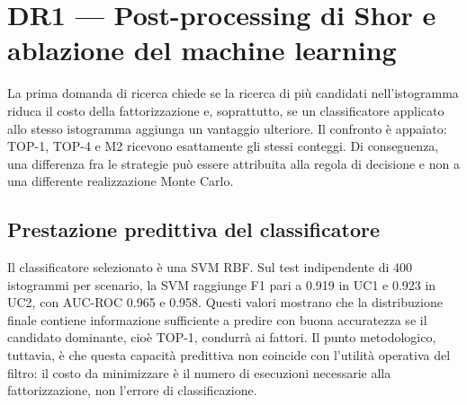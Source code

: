 \section{DR1 --- Post-processing di Shor e ablazione del machine learning}\label{sec:finale_5_1}\label{sec:setup_m1}

La prima domanda di ricerca chiede se la ricerca di più candidati nell'istogramma riduca il costo della fattorizzazione e, soprattutto, se un classificatore applicato allo stesso istogramma aggiunga un vantaggio ulteriore. Il confronto è appaiato: TOP-1, TOP-4 e M2 ricevono esattamente gli stessi conteggi. Di conseguenza, una differenza fra le strategie può essere attribuita alla regola di decisione e non a una differente realizzazione Monte Carlo.

\subsection{Prestazione predittiva del classificatore}\label{sec:finale_5_1_1}

Il classificatore selezionato è una SVM RBF. Sul test indipendente di 400 istogrammi per scenario, la SVM raggiunge F1 pari a 0.919 in UC1 e 0.923 in UC2, con AUC-ROC 0.965 e 0.958. Questi valori mostrano che la distribuzione finale contiene informazione sufficiente a predire con buona accuratezza se il candidato dominante, cioè TOP-1, condurrà ai fattori. Il punto metodologico, tuttavia, è che questa capacità predittiva non coincide con l'utilità operativa del filtro: il costo da minimizzare è il numero di esecuzioni necessarie alla fattorizzazione, non l'errore di classificazione.

